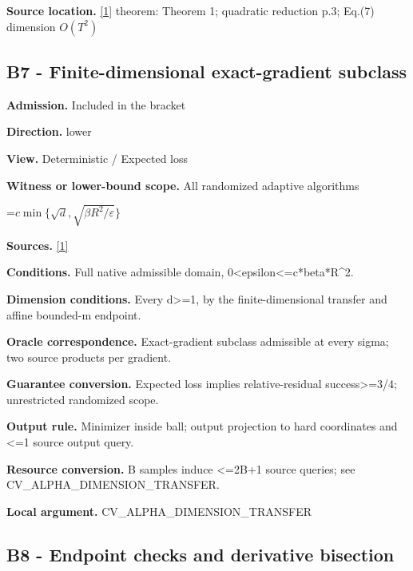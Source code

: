 \documentclass[10pt,a4paper]{article}
\newcommand{\AtlasMath}[1]{\par\begingroup\centering\setbox0=\hbox{$\displaystyle #1$}\ifdim\wd0>1.4\linewidth\typeout{ATLAS WIDE FORMULA: \the\wd0}\fi\ifdim\wd0>\linewidth\resizebox{\linewidth}{!}{\box0}\else\box0\fi\par\endgroup}
\begin{document}
\textbf{Source location.} \href{https://arxiv.org/pdf/2609.10874}{[1]} theorem: Theorem 1; quadratic reduction p.3; Eq.(7) dimension $O(T^2)$



\subsection{B7 - Finite-dimensional exact-gradient subclass}


\textbf{Admission.} Included in the bracket



\textbf{Direction.} lower



\textbf{View.} Deterministic / Expected loss



\textbf{Witness or lower-bound scope.} All randomized adaptive algorithms



\AtlasMath{c\min\{\sqrt d,\sqrt{\beta R^2/\varepsilon}\}}


\textbf{Sources.} \href{https://arxiv.org/pdf/2609.10874}{[1]}



\textbf{Conditions.} Full native admissible domain, 0<epsilon<=c*beta*R\textasciicircum{}2.



\textbf{Dimension conditions.} Every d>=1, by the finite-dimensional transfer and affine bounded-m endpoint.



\textbf{Oracle correspondence.} Exact-gradient subclass admissible at every sigma; two source products per gradient.



\textbf{Guarantee conversion.} Expected loss implies relative-residual success>=3/4; unrestricted randomized scope.



\textbf{Output rule.} Minimizer inside ball; output projection to hard coordinates and <=1 source output query.



\textbf{Resource conversion.} B samples induce <=2B+1 source queries; see CV\_ALPHA\_DIMENSION\_TRANSFER.



\textbf{Local argument.} CV\_ALPHA\_DIMENSION\_TRANSFER



\subsection{B8 - Endpoint checks and derivative bisection}
\end{document}
